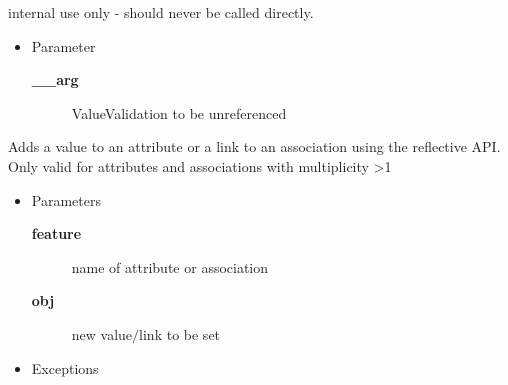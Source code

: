 \begin{desc}internal use only - should never be called directly.
\begin{itemize}
\item{Parameter
  \begin{description}
   \item[{\bf \_\_arg}]{ValueValidation to be unreferenced}
  \end{description}}
\end{itemize}
\end{desc}

\begin{desc}Adds a value to an attribute or a link to an association using the
 reflective API. Only valid for attributes and associations with
 multiplicity \textgreater  1
\begin{itemize}
\item{Parameters
  \begin{description}
   \item[{\bf feature}]{name of attribute or association}
   \item[{\bf obj}]{new value$/$link to be set}
  \end{description}}
\end{itemize}
\begin{itemize}
\item{{Exceptions}
}
\end{itemize}
\end{desc}

